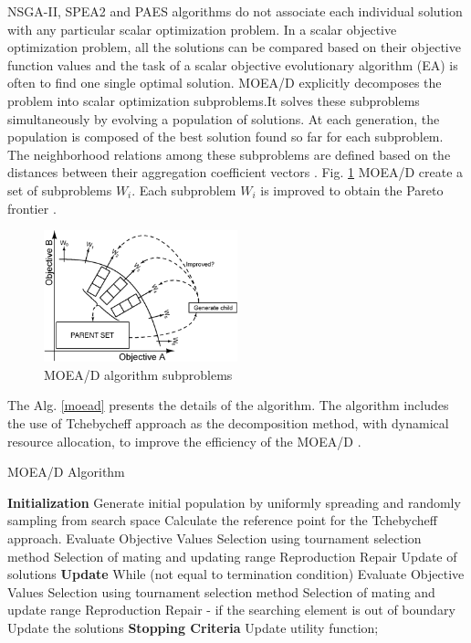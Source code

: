 \documentclass[espaco=umemeio,chapter=TITLE,twoside,openright]{abnt}
\begin{document}
NSGA-II, SPEA2 and PAES algorithms  do not associate each individual solution with
any particular scalar optimization problem. In a scalar objective optimization problem, all the solutions can be compared based
on their objective function values and the task of a scalar objective evolutionary algorithm (EA) is often to find one single
optimal solution. MOEA/D explicitly decomposes the problem into scalar optimization subproblems.It solves these subproblems simultaneously by evolving
a population of solutions. At each generation, the population is
composed of the best solution found so far for each subproblem. The neighborhood relations among these subproblems are defined based on the distances between their aggregation coefficient vectors \cite{Zhang2007} \cite{McConaghy2011}. Fig. \ref{fig:moead} MOEA/D create a set of subproblems $W_{i}$. Each subproblem $W_{i}$ is improved to obtain the Pareto frontier \cite{McConaghy2011}. 


\begin{figure}[h]
\centering
\includegraphics[width=0.5\textwidth]{./images/moead.png}
\caption{MOEA/D algorithm subproblems \cite{McConaghy2011}}
\label{fig:moead}
\end{figure}

The Alg. \ref{moead} presents the details of the algorithm. The algorithm  includes the
use of Tchebycheff approach as the decomposition method, with dynamical resource allocation, to improve the efficiency of the MOEA/D \cite{Yuen2009}. 

\begin{algorithm}[h]
  \caption{MOEA/D Algorithm}
  \label{moead}
  \begin{algorithmic}[1]
    \State \textbf{Initialization}
    \State Generate initial population by uniformly spreading and randomly sampling from search space
    \State Calculate the reference point for the Tchebycheff approach.
   \State Evaluate Objective Values 
   \State Selection using tournament selection method 
   \State Selection of mating and updating range
   \State Reproduction
   \State Repair
   \State Update of solutions 
   \State \textbf{Update}
   \State While (not equal to termination condition)
  \State Evaluate Objective Values
  \State Selection using tournament selection method
  \State Selection of mating and update range
  \State Reproduction
  \State Repair - if the searching element is out of boundary
  \State Update the solutions 
  \State \textbf{Stopping Criteria}
  \State Update utility function;
  \EndIf    
  \end{algorithmic}
\end{algorithm}
\end{document}
